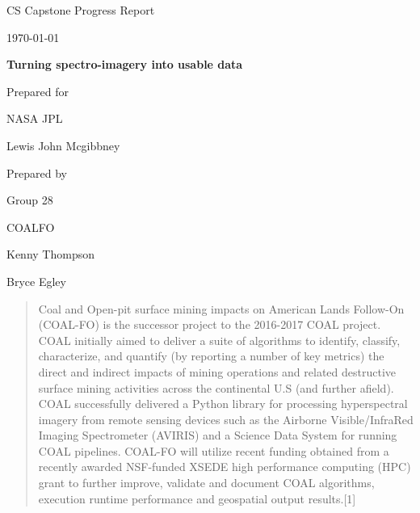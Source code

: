 \documentclass[onecolumn, draftclsnofoot,10pt, compsoc]{IEEEtran}
\def \CapstoneTeamName{		COALFO}
\def \CapstoneTeamNumber{		28}
\def \GroupMemberOne{			Kenny Thompson}
\def \GroupMemberTwo{			Bryce Egley}
\def \CapstoneProjectName{		Turning spectro-imagery into usable data}
\def \CapstoneSponsorCompany{	NASA JPL}
\def \CapstoneSponsorPerson{		Lewis John Mcgibbney}
\def \DocType{	%
				Progress Report
				}
\newcommand{\NameSigPair}[1]{\par
\makebox[2.75in][r]{#1} \hfil 	\makebox[3.25in]{\makebox[2.25in]{\hrulefill} \hfill		\makebox[.75in]{\hrulefill}}
\par\vspace{-12pt} \textit{\tiny\noindent
\makebox[2.75in]{} \hfil		\makebox[3.25in]{\makebox[2.25in][r]{Signature} \hfill	\makebox[.75in][r]{Date}}}}
\renewcommand{\NameSigPair}[1]{#1}
\begin{document}
\begin{titlepage}
    \begin{singlespace}
        \hfill
        \par\vspace{.2in}
        \centering
        \scshape{
            \huge CS Capstone \DocType \par
            {\large\today}\par
            \vspace{.5in}
            \textbf{\Huge\CapstoneProjectName}\par
            \vfill
            {\large Prepared for}\par
            \Huge \CapstoneSponsorCompany\par
            \vspace{5pt}
            {\Large\NameSigPair{\CapstoneSponsorPerson}\par}
            {\large Prepared by }\par
            Group\CapstoneTeamNumber\par
            \CapstoneTeamName\par
            \vspace{5pt}
            {\Large
                \NameSigPair{\GroupMemberOne}\par
                \NameSigPair{\GroupMemberTwo}\par
            }
            \vspace{20pt}
        }
        \begin{abstract}
        	Coal and Open-pit surface mining impacts on American Lands Follow-On (COAL-FO) is the successor 				project to the 2016-2017 COAL project. COAL initially aimed to deliver a suite of algorithms to identify, classify, characterize, and quantify (by reporting a number of key metrics) the direct and indirect impacts of mining operations and related destructive surface mining activities across the continental U.S (and further afield). COAL successfully delivered a Python library for processing hyperspectral imagery from remote sensing devices such as the Airborne Visible/InfraRed Imaging Spectrometer (AVIRIS) and a Science Data System for running COAL pipelines. COAL-FO will utilize recent funding obtained from a recently awarded NSF-funded XSEDE high performance computing (HPC) grant to further improve, validate and document COAL algorithms, execution runtime performance and geospatial output results.[1]
        \end{abstract}
    \end{singlespace}
\end{titlepage}
\newpage
{}
\tableofcontents
\clearpage
\end{document}
